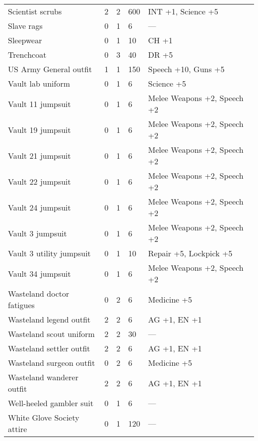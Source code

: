 \begin{longtable}{|p{4cm}|p{1.2cm}|p{1.2cm}|p{1.2cm}|p{4cm}|}
Scientist scrubs & 2 & 2 & 600 & INT +1, Science +5 \\
Slave rags & 0 & 1 & 6 & — \\
Sleepwear & 0 & 1 & 10 & CH +1 \\
Trenchcoat & 0 & 3 & 40 & DR +5 \\
US Army General outfit & 1 & 1 & 150 & Speech +10, Guns +5 \\
Vault lab uniform & 0 & 1 & 6 & Science +5 \\
Vault 11 jumpsuit & 0 & 1 & 6 & Melee Weapons +2, Speech +2 \\
Vault 19 jumpsuit & 0 & 1 & 6 & Melee Weapons +2, Speech +2 \\
Vault 21 jumpsuit & 0 & 1 & 6 & Melee Weapons +2, Speech +2 \\
Vault 22 jumpsuit & 0 & 1 & 6 & Melee Weapons +2, Speech +2 \\
Vault 24 jumpsuit & 0 & 1 & 6 & Melee Weapons +2, Speech +2 \\
Vault 3 jumpsuit & 0 & 1 & 6 & Melee Weapons +2, Speech +2 \\
Vault 3 utility jumpsuit & 0 & 1 & 10 & Repair +5, Lockpick +5 \\
Vault 34 jumpsuit & 0 & 1 & 6 & Melee Weapons +2, Speech +2 \\
Wasteland doctor fatigues & 0 & 2 & 6 & Medicine +5 \\
Wasteland legend outfit & 2 & 2 & 6 & AG +1, EN +1 \\
Wasteland scout uniform & 2 & 2 & 30 & — \\
Wasteland settler outfit & 2 & 2 & 6 & AG +1, EN +1 \\
Wasteland surgeon outfit & 0 & 2 & 6 & Medicine +5 \\
Wasteland wanderer outfit & 2 & 2 & 6 & AG +1, EN +1 \\
Well-heeled gambler suit & 0 & 1 & 6 & — \\
White Glove Society attire & 0 & 1 & 120 & — \\
\hline
\end{longtable}
